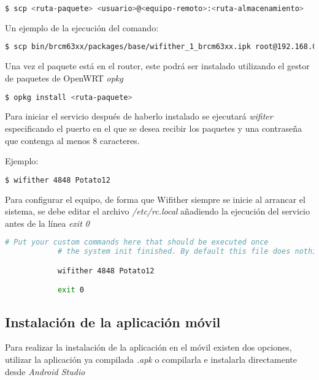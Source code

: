 \documentclass{article}
\begin{document}
        \begin{lstlisting}[language=bash]
            $ scp <ruta-paquete> <usuario>@<equipo-remoto>:<ruta-almacenamiento>
        \end{lstlisting}

        Un ejemplo de la ejecución del comando:
        \begin{lstlisting}[language=bash]
            $ scp bin/brcm63xx/packages/base/wifither_1_brcm63xx.ipk root@192.168.0.4:/root/wifither
        \end{lstlisting}

        Una vez el paquete está en el router, este podrá ser instalado utilizando el gestor de paquetes de OpenWRT \textit{opkg}
        \begin{lstlisting}[language=bash]
            $ opkg install <ruta-paquete>
        \end{lstlisting}

        Para iniciar el servicio después de haberlo instalado se ejecutará \textit{wifiter} especificando el puerto en el que se desea recibir los paquetes y una contraseña que contenga al menos 8 caracteres.

        Ejemplo:
        \begin{lstlisting}[language=bash]
            $ wifither 4848 Potato12
        \end{lstlisting}

        Para configurar el equipo, de forma que Wifither siempre se inicie al arrancar el sistema, se debe editar el archivo \textit{/etc/rc.local} añadiendo la ejecución del servicio antes de la línea \textit{exit 0}

        \begin{lstlisting}[language=bash]
            # Put your custom commands here that should be executed once
            # the system init finished. By default this file does nothing.

            wifither 4848 Potato12

            exit 0
        \end{lstlisting}


    \subsection{Instalación de la aplicación móvil}
        Para realizar la instalación de la aplicación en el móvil existen dos opciones, utilizar la aplicación ya compilada \textit{.apk} o compilarla e instalarla directamente desde \textit{Android Studio}
\end{document}
